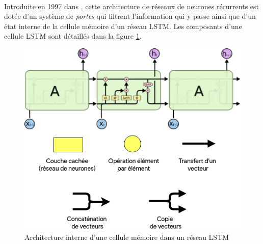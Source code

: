 \paragraph{}
Introduite en 1997 dans \citep{lstm_original_paper}, cette architecture de réseaux de neurones récurrents est dotée d'un système de \textit{portes} qui filtrent l'information qui y passe ainsi que d'un état interne de la cellule mémoire d'un réseau LSTM. Les composants d'une cellule LSTM  sont détaillés dans la figure \ref{lstm_architecture}. 
\begin{figure}[h]
	\centering
	\includegraphics[width=0.5\linewidth]{images/notions/lstm_arch.png}
	\caption{Architecture interne d'une cellule mémoire dans un réseau LSTM \citep{rnns_online}}
	\label{lstm_architecture}
\end{figure}
